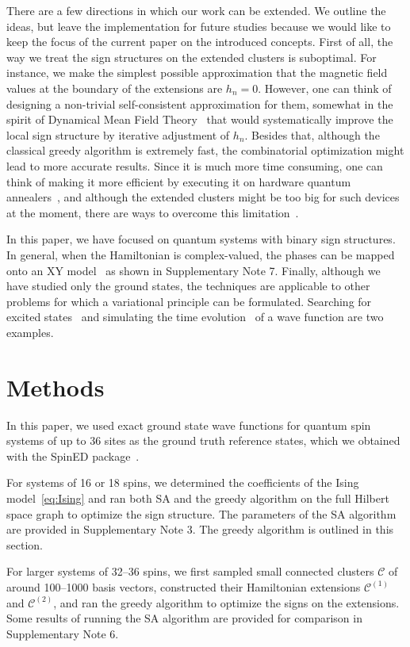 There are a few directions in which our work can be extended. We outline the ideas, but leave the implementation for future studies because we would like to keep the focus of the current paper on the introduced concepts. First of all, the way we treat the sign structures on the extended clusters is suboptimal. For instance, we make the simplest possible approximation that the magnetic field values at the boundary of the extensions are $h_n=0$. However, one can think of designing a non-trivial self-consistent approximation for them, somewhat in the spirit of Dynamical Mean Field Theory~\cite{DMFT} that would systematically improve the local sign structure by iterative adjustment of $h_n$. Besides that, although the classical greedy algorithm is extremely fast, the combinatorial optimization might lead to more accurate results. Since it is much more time consuming, one can think of making it more efficient by executing it on hardware quantum annealers~\cite{QA,QA2,QA3}, and although the extended clusters might be too big for such devices at the moment, there are ways to overcome this limitation~\cite{raymond2022hybrid,okada2019improving}.

In this paper, we have focused on quantum systems with binary sign structures. In general, when the Hamiltonian is complex-valued, the phases can be mapped onto an XY model~\cite{XY_model} as shown in Supplementary Note 7. Finally, although we have studied only the ground states, the techniques are applicable to other problems for which a variational principle can be formulated. Searching for excited states~\cite{excited} and simulating the time evolution~\cite{TDVP} of a wave function are two examples.

\section{Methods}

In this paper, we used exact ground state wave functions for quantum spin systems of up to 36 sites as the ground truth reference states, which we obtained with the SpinED package~\cite{SpinED}.

For systems of 16 or 18 spins, we determined the coefficients of the Ising model~\eqref{eq:Ising} and ran both SA and the greedy algorithm on the full Hilbert space graph to optimize the sign structure.
The parameters of the SA algorithm are provided in Supplementary Note 3.
The greedy algorithm is outlined in this section.

For larger systems of 32--36 spins, we first sampled small connected clusters $\mathcal{C}$ of around 100--1000 basis vectors, constructed their Hamiltonian extensions $\mathcal{C}^{(1)}$ and $\mathcal{C}^{(2)}$, and ran the greedy algorithm to optimize the signs on the extensions.
Some results of running the SA algorithm are provided for comparison in Supplementary Note 6.

